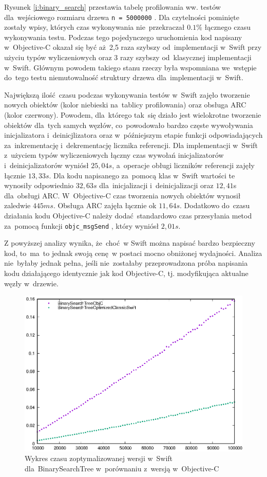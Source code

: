 \documentclass[mgr, shortabstract]{iithesis}
\newcommand{\swiftinline}[1]{
    \texttt{#1}
}
\newcommand{\objcinline}[1]{
    \texttt{#1}
}
\begin{document}
Rysunek \ref{i:binary_search} przestawia tabelę profilowania ww. testów dla~wejściowego rozmiaru drzewa \swiftinline{n = 5000000}. Dla czytelności pominięte zostały wpisy, których czas wykonywania nie~przekraczał $0.1\%$ łącznego czasu wykonywania testu. Podczas tego pojedynczego uruchomienia kod napisany w~Objective-C okazał się być aż~2,5 raza szybszy od~implementacji w~Swift przy użyciu typów wyliczeniowych oraz 3 razy szybszy od~klasycznej implementacji w~Swift. Głównym powodem takiego stanu rzeczy była wspomniana we~wstępie do~tego testu niemutowalność struktury drzewa dla~implementacji w~Swift. 

Największą ilość czasu podczas wykonywania testów w~Swift zajęło tworzenie nowych obiektów (kolor niebieski na~tablicy profilowania) oraz obsługa ARC (kolor czerwony). Powodem, dla~którego tak~się działo jest wielokrotne tworzenie obiektów dla~tych samych węzłów, co~powodowało bardzo częste wywoływania inicjalizatora i~deinicjlizatora oraz w~późniejszym etapie funkcji odpowiadających za~inkrementację i~dekrementację licznika referencji. Dla implementacji w~Swift z~użyciem typów wyliczeniowych łączny czas wywołań inicjalizatorów i~deinicjalizatorów wyniósł $25,04s$, a~operacje obługi liczników referencji zajęły łącznie $13,33s$. Dla kodu napisanego za~pomocą klas w~Swift wartości te wynosiły odpowiednio $32,63s$ dla~inicjalizacji i~deinicjalizacji oraz $12,41$s dla~obsługi ARC. W~Objective-C czas tworzenia nowych obiektów wynosił zaledwie $445ms$. Obsługa ARC zajęła łącznie ok $11,64s$. Dodatkowo do~czasu działania kodu Objective-C należy dodać standardowo czas przesyłania metod za~pomocą funkcji \objcinline{objc_msgSend}, który wyniósł $2,01s$.

Z powyższej analizy wynika, że~choć w Swift można napisać bardzo bezpieczny kod, to~ma~to jednak swoją cenę w postaci mocno obniżonej wydajności. Analiza nie~byłaby jednak pełna, jeśli nie~zostałaby przeprowadzona próba napisania kodu działającego identycznie jak kod Objective-C, tj. modyfikująca aktualne węzły w~drzewie. 

\begin{figure}
    \includegraphics{plots/BinarySearchTree2.eps}
    \caption{Wykres czasu zoptymalizowanej wersji w~Swift dla~BinarySearchTree w~porównaniu z~wersją w~Objective-C}
    \label{p:binary_search2}
\end{figure}
\end{document}
